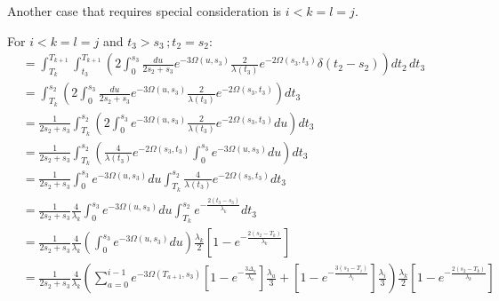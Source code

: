 \documentclass{article}
\begin{document}
Another case that requires special consideration is $i<k=l=j$.

For $i<k=l=j$ and $t_3>s_3\,;t_2=s_2$:
\begin{align*}
    &=\int_{T_k}^{T_{k+1}}\int_{t_3}^{T_{k+1}}\left(2\int_0^{s_3}\frac{du}{2s_2+s_3}e^{-3\Omega(u,s_3)}\frac{2}{\lambda(t_3)}e^{-2\Omega(s_3,t_3)}\delta(t_2-s_2)\right)dt_2\,dt_3\\
    &=\int_{T_k}^{s_2}\left(2\int_0^{s_3}\frac{du}{2s_2+s_3}e^{-3\Omega(u,s_3)}\frac{2}{\lambda(t_3)}e^{-2\Omega(s_3,t_3)}\right)dt_3\\
    &=\frac{1}{2s_2+s_3}\int_{T_k}^{s_2}\left(2\int_0^{s_3}e^{-3\Omega(u,s_3)}\frac{2}{\lambda(t_3)}e^{-2\Omega(s_3,t_3)}du\right)dt_3\\
    &=\frac{1}{2s_2+s_3}\int_{T_k}^{s_2}\left(\frac{4}{\lambda(t_3)}e^{-2\Omega(s_3,t_3)}\int_0^{s_3}e^{-3\Omega(u,s_3)}du\right)dt_3\\
    &=\frac{1}{2s_2+s_3}\int_0^{s_3}e^{-3\Omega(u,s_3)}du\int_{T_k}^{s_2}\frac{4}{\lambda(t_3)}e^{-2\Omega(s_3,t_3)}dt_3\\
    &=\frac{1}{2s_2+s_3}\frac{4}{\lambda_k}\int_0^{s_3}e^{-3\Omega(u,s_3)}du\int_{T_k}^{s_2}e^{-\frac{2(t_3-s_3)}{\lambda_k}}dt_3\\
    &=\frac{1}{2s_2+s_3}\frac{4}{\lambda_k}\left(\int_0^{s_3}e^{-3\Omega(u,s_3)}du\right)
    \frac{\lambda_k}{2}\left[1-e^{-\frac{2(s_2-T_k)}{\lambda_k}}\right]\\
    &=\frac{1}{2s_2+s_3}\frac{4}{\lambda_k}\left(
    \sum_{a=0}^{i-1} e^{-3\Omega(T_{a+1},s_3)}
    \left[1-e^{-\frac{3 \Delta_a}{\lambda_a}}\right]\frac{\lambda_a}{3}+
    \left[1-e^{-\frac{3 \left(s_3-T_{i}\right)}{\lambda_{i}}}\right]\frac{\lambda_{i}}{3}
    \right)
    \frac{\lambda_k}{2}\left[1-e^{-\frac{2(s_2-T_k)}{\lambda_k}}\right]\\
\end{align*}
\end{document}
